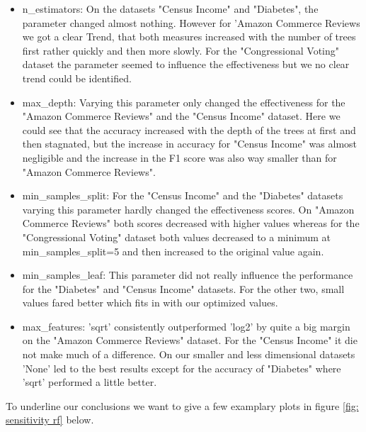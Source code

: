 \documentclass[a4paper,10pt]{article}
\begin{document}
\begin{itemize}
    \item \textsf{n\_estimators}: On the datasets "Census Income" and "Diabetes", the parameter changed almost nothing. However for 'Amazon Commerce Reviews we got a clear Trend, that both measures increased with the number of trees first rather quickly and then more slowly. For the "Congressional Voting" dataset the parameter seemed to influence the effectiveness but we no clear trend could be identified. 
\item \textsf{max\_depth}: Varying this parameter only changed the effectiveness for the "Amazon Commerce Reviews"  and the "Census Income" dataset. Here we could see that the accuracy increased with the depth of the trees at first and then stagnated, but the increase in accuracy for "Census Income" was almost negligible and the increase in the F1 score was also way smaller than for "Amazon Commerce Reviews".

\item \textsf{min\_samples\_split}: For the "Census Income" and the "Diabetes" datasets varying this parameter hardly changed the effectiveness scores. On "Amazon Commerce Reviews" both scores decreased with higher values whereas for the "Congressional Voting" dataset both values decreased to a minimum at \\ \textsf{min\_samples\_split}=5 and then increased to the original value again.
\item \textsf{min\_samples\_leaf}: This parameter did not really influence the performance for the "Diabetes" and "Census Income" datasets. For the other two, small values fared better which fits in with our optimized values.
\item \textsf{max\_features}: 'sqrt' consistently outperformed 'log2' by quite a big margin on the "Amazon Commerce Reviews" dataset. For the "Census Income" it die not make much of a difference. On our smaller and less dimensional datasets 'None' led to the best results except for the accuracy of "Diabetes" where 'sqrt' performed a little better.
\end{itemize}

To underline our conclusions we want to give a few examplary plots in figure \ref{fig: sensitivity rf} below. 
\end{document}
